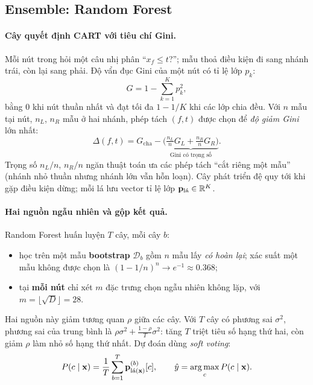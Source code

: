 \subsection{Ensemble: Random Forest}
 
\paragraph{Cây quyết định CART với tiêu chí Gini.} Mỗi nút trong hỏi một câu nhị phân ``$x_f\le t$?''; mẫu thoả điều kiện đi sang nhánh trái, còn lại sang phải. Độ vẩn đục Gini của một nút có tỉ lệ lớp $p_k$:
\begin{equation}
G=1-\sum_{k=1}^{K}p_k^2,
\end{equation}
bằng 0 khi nút thuần nhất và đạt tối đa $1-1/K$ khi các lớp chia đều. Với $n$ mẫu tại nút, $n_L$, $n_R$ mẫu ở hai nhánh, phép tách $(f,t)$ được chọn để \emph{độ giảm Gini} lớn nhất:
\begin{equation}
\Delta(f,t)=G_{\text{cha}}-\underbrace{\Big(\tfrac{n_L}{n}G_L+\tfrac{n_R}{n}G_R\Big)}_{\text{Gini có trọng số}}.
\end{equation}
Trọng số $n_L/n$, $n_R/n$ ngăn thuật toán ưa các phép tách ``cắt riêng một mẫu'' (nhánh nhỏ thuần nhưng nhánh lớn vẫn hỗn loạn). Cây phát triển đệ quy tới khi gặp điều kiện dừng; mỗi lá lưu vector tỉ lệ lớp $\mathbf{p}_{\text{lá}}\in\mathbb{R}^K$.
 
\paragraph{Hai nguồn ngẫu nhiên và gộp kết quả.} Random Forest huấn luyện $T$ cây, mỗi cây $b$:
\begin{itemize}
\item học trên một mẫu \textbf{bootstrap} $\mathcal{D}_b$ gồm $n$ mẫu lấy \emph{có hoàn lại}; xác suất một mẫu không được chọn là $(1-1/n)^n\to e^{-1}\approx0.368$;
\item tại \textbf{mỗi nút} chỉ xét $m$ đặc trưng chọn ngẫu nhiên không lặp, với $m=\lfloor\sqrt{D}\rfloor=28$.
\end{itemize}
Hai nguồn này giảm tương quan $\rho$ giữa các cây. Với $T$ cây có phương sai $\sigma^2$, phương sai của trung bình là $\rho\sigma^2+\frac{1-\rho}{T}\sigma^2$: tăng $T$ triệt tiêu số hạng thứ hai, còn giảm $\rho$ làm nhỏ số hạng thứ nhất. Dự đoán dùng \emph{soft voting}:
\begin{equation}
P(c\mid\mathbf{x})=\frac1T\sum_{b=1}^{T}\mathbf{p}^{(b)}_{\text{lá}(\mathbf{x})}[c],\qquad \hat y=\operatorname*{arg\,max}_c P(c\mid\mathbf{x}).
\end{equation}
 
